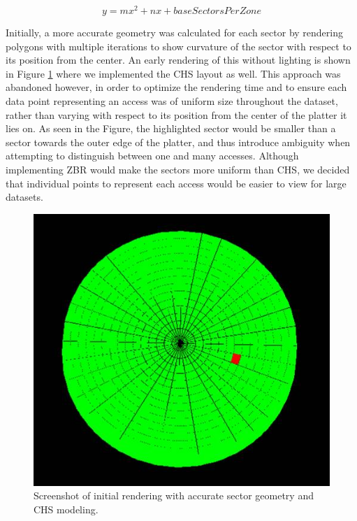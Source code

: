 \documentclass[12pt]{ucthesis}
\begin{document}
$$y = mx^{2} + nx + baseSectorsPerZone$$

Initially, a more accurate geometry was calculated for each sector by rendering polygons with multiple iterations to show curvature of the sector with respect to its position from the center. An early rendering of this without lighting is shown in Figure \ref{fig:initial_disk} where we implemented the CHS layout as well. This approach was abandoned however, in order to optimize the rendering time and to ensure each data point representing an access was of uniform size throughout the dataset, rather than varying with respect to its position from the center of the platter it lies on. As seen in the Figure, the highlighted sector would be smaller than a sector towards the outer edge of the platter, and thus introduce ambiguity when attempting to distinguish between one and many accesses. Although implementing ZBR would make the sectors more uniform than CHS, we decided that individual points to represent each access would be easier to view for large datasets.

\begin{figure}[h!]
 \centering
 \includegraphics[width=\textwidth]{images/initial_hard_disk.jpg}
 \caption[Screenshot of initial rendering with accurate sector geometry.]{Screenshot of initial rendering with accurate sector geometry and CHS modeling.}
 \label{fig:initial_disk}
\end{figure}
\end{document}
